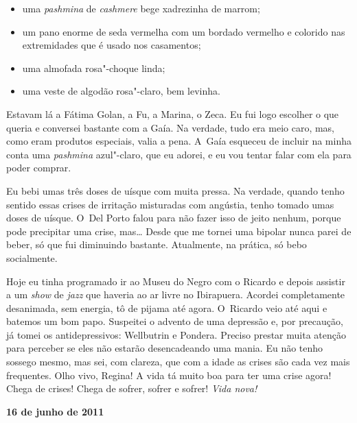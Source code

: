 \begin{itemize}
\item
  uma \emph{pashmina} de \emph{cashmere} bege xadrezinha de marrom;
\item
  um pano enorme de seda vermelha com um bordado vermelho e colorido nas
  extremidades que é usado nos casamentos;
\item
  uma almofada rosa"-choque linda;
\item
  uma veste de algodão rosa"-claro, bem levinha.
\end{itemize}

Estavam lá a Fátima Golan, a Fu, a Marina, o Zeca. Eu fui logo escolher
o que queria e conversei bastante com a Gaía. Na verdade, tudo era meio
caro, mas, como eram produtos especiais, valia a pena. A~Gaía esqueceu
de incluir na minha conta uma \emph{pashmina} azul"-claro, que eu adorei,
e eu vou tentar falar com ela para poder comprar.

Eu bebi umas três doses de uísque com muita pressa. Na verdade, quando
tenho sentido essas crises de irritação misturadas com angústia, tenho
tomado umas doses de uísque. O~Del Porto falou para não fazer isso de
jeito nenhum, porque pode precipitar uma crise, mas… Desde que me
tornei uma bipolar nunca parei de beber, só que fui diminuindo bastante.
Atualmente, na prática, só bebo socialmente.

Hoje eu tinha programado ir ao Museu do Negro com o Ricardo e depois
assistir a um \emph{show} de \emph{jazz} que haveria ao ar livre no
Ibirapuera. Acordei completamente desanimada, sem energia, tô de pijama
até agora. O~Ricardo veio até aqui e batemos um bom papo. Suspeitei o
advento de uma depressão e, por precaução, já tomei os antidepressivos:
Wellbutrin e Pondera. Preciso prestar muita atenção para perceber se
eles não estarão desencadeando uma mania. Eu não tenho sossego mesmo,
mas sei, com clareza, que com a idade as crises são cada vez mais
frequentes. Olho vivo, Regina! A vida tá muito boa para ter uma crise
agora! Chega de crises! Chega de sofrer, sofrer e sofrer! \emph{Vida
nova!}

\begin{center}\asterisc{}\end{center}

\begin{flushright}\textbf{}\end{flushright}

\begin{flushright}\textbf{16 de junho de 2011}\end{flushright}


